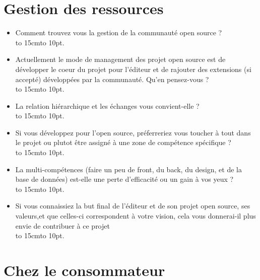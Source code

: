 \section*{Gestion des ressources}

\begin{itemize}[label=\textbullet, font=\LARGE \color{burntorange}]
	\item Comment trouvez vous la gestion de la communauté open source ?\\
	\hbox to 15cm{\leaders\hbox to 10pt{\hss . \hss}\hfil}
	\item Actuellement le mode de management des projet open source est de développer le coeur du projet pour l'éditeur et de rajouter des extensions (si accepté) développées par la communauté. Qu'en pensez-vous ?\\
	\hbox to 15cm{\leaders\hbox to 10pt{\hss . \hss}\hfil}
	\item La relation hiérarchique et les échanges vous convient-elle ?\\
	\hbox to 15cm{\leaders\hbox to 10pt{\hss . \hss}\hfil}
	\item Si vous développez pour l'open source, préferreriez vous toucher à tout dans le projet ou plutot être assigné à une zone de compétence spécifique ?\\
	\hbox to 15cm{\leaders\hbox to 10pt{\hss . \hss}\hfil}
	\item La multi-compétences (faire un peu de front, du back, du design, et de la base de données) est-elle une perte d'efficacité ou un gain à vos yeux ?\\
	\hbox to 15cm{\leaders\hbox to 10pt{\hss . \hss}\hfil}
	\item Si vous connaissiez la but final de l'éditeur et de son projet open source, ses valeurs,et que celles-ci correspondent à votre vision, cela vous donnerai-il plus envie de contribuer à ce projet\\
	\hbox to 15cm{\leaders\hbox to 10pt{\hss . \hss}\hfil}
\end{itemize}

\newpage
\section*{Chez le consommateur}

